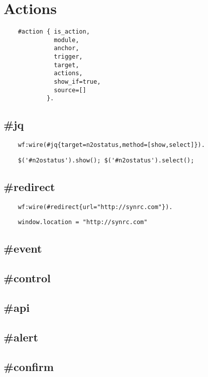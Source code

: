 \section{Actions}

\vspace{1\baselineskip}
\begin{lstlisting}
    #action { is_action,
              module,
              anchor,
              trigger,
              target,
              actions,
              show_if=true,
              source=[]
            }.
\end{lstlisting}
\vspace{1\baselineskip}


\subsection{\#jq}

\vspace{1\baselineskip}
\begin{lstlisting}
    wf:wire(#jq{target=n2ostatus,method=[show,select]}).
\end{lstlisting}
\vspace{1\baselineskip}

\vspace{1\baselineskip}
\begin{lstlisting}
    $('#n2ostatus').show(); $('#n2ostatus').select();
\end{lstlisting}
\vspace{1\baselineskip}

\subsection{\#redirect}
\vspace{1\baselineskip}
\begin{lstlisting}
    wf:wire(#redirect{url="http://synrc.com"}).
\end{lstlisting}
\vspace{1\baselineskip}

\vspace{1\baselineskip}
\begin{lstlisting}
    window.location = "http://synrc.com"
\end{lstlisting}
\vspace{1\baselineskip}

\subsection{\#event}

\subsection{\#control}

\subsection{\#api}

\subsection{\#alert}

\subsection{\#confirm}


